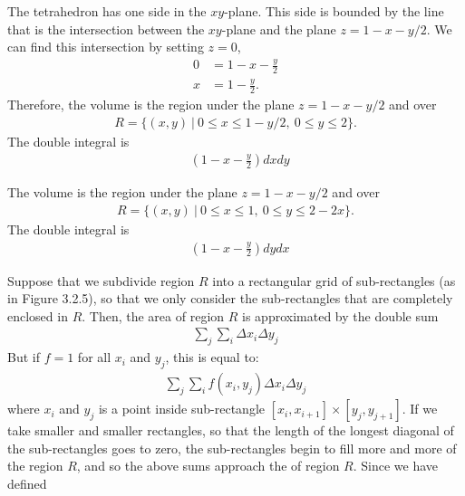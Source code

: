 \documentclass{article}
\begin{document}
\item The tetrahedron has one side in the $xy$-plane. This side is bounded by the line that is the intersection between the $xy$-plane and the plane $z = 1 - x - y/2$. We can find this intersection by setting $z=0$,
\begin{align*}
  0 &= 1 - x - \frac{y}{2} \\
  x &= 1 - \frac{y}{2}.
\end{align*}
Therefore, the volume is the region under the plane $z = 1 - x - y/2$ and over  
\begin{align*}
  R = \{ (x,y) \ | \ 0 \le x \le 1- y/2, \ 0 \le y \le 2 \}.
\end{align*}
The double integral is 
\begin{align*}
  \mathop{\int_{0}^{2} \! \int_0^{1-y/2} } (1 - x - \frac{y}{2}) dxdy
\end{align*} 
\item The volume is the region under the plane $z = 1 - x - y/2$ and over  
\begin{align*}
  R = \{ (x,y) \ | \ 0 \le x \le 1, \ 0 \le y \le 2 - 2x \}.
\end{align*}
The double integral is 
\begin{align*}
  \mathop{\int_{0}^{1} \! \int_0^{2-2x} } (1 - x - \frac{y}{2}) dydx
\end{align*} 
\EEN
\item %
Suppose that we subdivide region $R$ into a rectangular grid of sub-rectangles (as in Figure 3.2.5), so that we only consider the sub-rectangles that are completely enclosed in $R$. Then, the area of region $R$ is approximated by the double sum
\begin{align*}
  \sum_j\sum_i\Delta x_i \Delta y_j
\end{align*}
But if $f=1$ for all $x_i$ and $y_j$, this is equal to:
\begin{align}\label{abefaberabreabr}
  \sum_j\sum_i f(x_i,y_j) \Delta x_i \Delta y_j
\end{align}
where $x_i$ and $y_j$ is a point inside sub-rectangle $[x_i,x_{i+1}]\times[y_j,y_{j+1}]$. 
If we take smaller and smaller rectangles, so that the length of the longest diagonal of the sub-rectangles goes to zero, the sub-rectangles begin to fill more and more of the region $R$, and so the above sums approach the   of region $R$. Since we have defined
\end{document}
